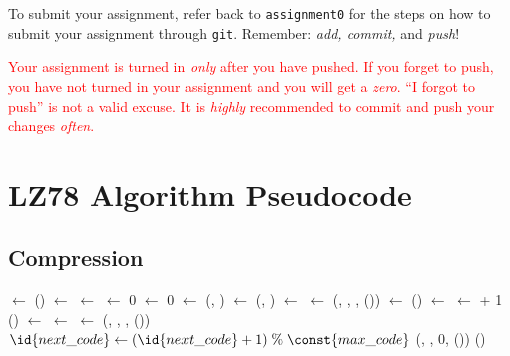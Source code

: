 \documentclass{article}
\begin{document}
To submit your assignment, refer back to \texttt{assignment0} for the steps on
how to submit your assignment through \texttt{git}. Remember:
\emph{add, commit,} and \emph{push}!

\textcolor{red}{Your assignment is turned in \emph{only} after you have pushed.
If you forget to push, you have not turned in your assignment and you will get
a \emph{zero}. ``I forgot to push'' is not a valid excuse. It is \emph{highly}
recommended to commit and push your changes \emph{often}.}

\appendix
\section{LZ78 Algorithm Pseudocode}

\subsection{Compression}

\begin{codebox}
    \li {} $\gets$ ()
    \li {} $\gets$ 
    \li {} $\gets$ 
    \li {} $\gets$ 0
    \li {} $\gets$ 0
    \li {} $\gets$ 
    \li \While {}(, )  
    \li \Then {} $\gets$ (,
              )
              \li     \If {}  
    \li     \Then {} $\gets$ 
    \li           {} $\gets$ 
    \li     \Else
    \li           {}(,
                  , ,
                  ())
    \li           {} $\gets$
                    ()
    \li           {} $\gets$ 
    \li {} $\gets$  + 1
            \End
            \li     \If {}  
    \li     \Then {}()
    \li           {} $\gets$ 
    \li           {} $\gets$ 
            \End
    \li     {} $\gets$ 
        \End
        \li \If {}  
    \li \Then {}(,
    , ,
    ())
    \li $\id{next\_code} \gets (\id{next\_code} + 1) \;\%\;\const{max\_code}$
        \End
        \li {}(, , 0,
        ())
        \li {}()
\end{codebox}
\end{document}
